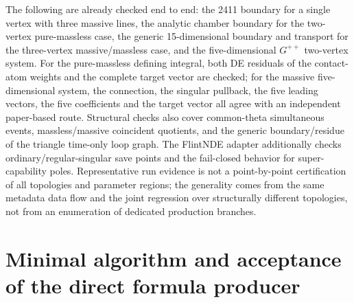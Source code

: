 \documentclass[11pt,a4paper]{article}
\begin{document}
The following are already checked end to end: the 2411 boundary for a single vertex with three massive lines, the analytic chamber boundary for the two-vertex pure-massless case, the generic 15-dimensional boundary and transport for the three-vertex massive/massless case, and the five-dimensional $G^{++}$ two-vertex system. For the pure-massless defining integral, both DE residuals of the contact-atom weights and the complete target vector are checked; for the massive five-dimensional system, the connection, the singular pullback, the five leading vectors, the five coefficients and the target vector all agree with an independent paper-based route. Structural checks also cover common-theta simultaneous events, massless/massive coincident quotients, and the generic boundary/residue of the triangle time-only loop graph. The FlintNDE adapter additionally checks ordinary/regular-singular save points and the fail-closed behavior for super-capability poles. Representative run evidence is not a point-by-point certification of all topologies and parameter regions; the generality comes from the same metadata data flow and the joint regression over structurally different topologies, not from an enumeration of dedicated production branches.

\section{Minimal algorithm and acceptance of the direct formula producer}
\end{document}
